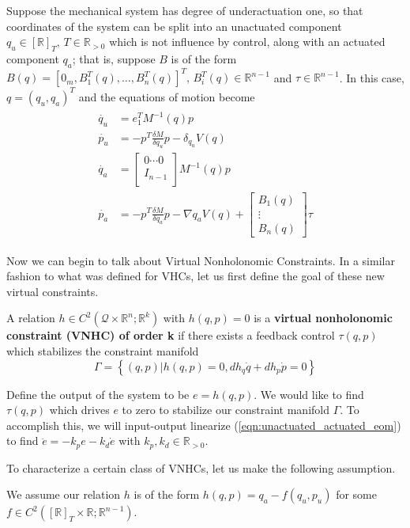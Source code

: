 Suppose the mechanical system has degree of underactuation one, so that coordinates of the system can be split into an unactuated component \(q_u \in [\mathbb{R}]_T, \, T \in \mathbb{R}_{>0}\) which is not influence by control, along with an actuated component \(q_a\); that is, suppose \(B\) is of the form \(B(q) = [0_m, B_1^T(q), \ldots, B_n^T(q)]^T, \, B_i^T(q) \in \mathbb{R}^{n-1}\) and \(\tau \in \mathbb{R}^{n-1}\). In this case, \(q = (q_u, q_a)^T\) and the equations of motion become
\begin{align}\label{eqn:unactuated_actuated_eom}
\begin{split}
\dot{q_u} &= e_1^T M^{-1}(q) p \\
\dot{p_u} &= -p^T\frac{\delta M}{\delta q_u} p - \delta_{q_u}V(q) \\
\dot{q_a} &= 
\begin{bmatrix}
0 \cdots 0 \\
I_{n-1} \\
\end{bmatrix} M^{-1}(q) p \\
\dot{p_a} &= -p^T\frac{\delta M}{\delta q_a} p - \nabla{q_a}V(q) + 
\begin{bmatrix}
B_1(q) \\
\vdots \\
B_n(q)
\end{bmatrix} \tau
\end{split}
\end{align}

Now we can begin to talk about Virtual Nonholonomic Constraints. In a similar fashion to what was defined for VHCs, let us first define the goal of these new virtual constraints.

\begin{defn}
A relation \(h \in C^2\left(\mathcal{Q}\times \mathbb{R}^n ; \mathbb{R}^k\right)\) with \(h(q,p) = 0\) is a \textbf{virtual nonholonomic constraint (VNHC) of order k} if there exists a feedback control \(\tau(q,p)\) which stabilizes the constraint manifold
\[
\Gamma = \left\{(q,p) | h(q,p) = 0, dh_q \dot{q} + dh_p \dot{p} = 0\right\}
\]
\end{defn}
Define the output of the system to be \(e = h(q,p)\). We would like to find \(\tau(q,p)\) which drives \(e\) to zero to stabilize our constraint manifold \(\Gamma\). To accomplish this, we will input-output linearize (\ref{eqn:unactuated_actuated_eom}) to find \(\ddot{e} = -k_p e - k_d \dot{e}\) with \(k_p, k_d \in \mathbb{R}_{> 0}\).

To characterize a certain class of VNHCs, let us make the following assumption.
\begin{assm}\label{assm:vnhc_is_on_qu_pu}
We assume our relation \(h\) is of the form \(h(q,p) = q_a - f(q_u,p_u)\) for some \(f \in C^2\left([\mathbb{R}]_T \times \mathbb{R} ; \mathbb{R}^{n - 1}\right)\).
\end{assm}

